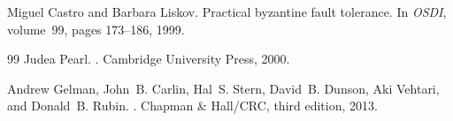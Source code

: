 \documentclass[12pt,a4paper]{article}
\begin{document}
\clearpage

\clearpage


\cite{sample2024}





Miguel Castro and Barbara Liskov.
\newblock Practical byzantine fault tolerance.
\newblock In {\em OSDI}, volume~99, pages 173--186, 1999.

\begin{thebibliography}{99}
Judea Pearl.
.
\newblock Cambridge University Press, 2000.

Andrew Gelman, John~B. Carlin, Hal~S. Stern, David~B. Dunson, Aki Vehtari, and Donald~B. Rubin.
.
\newblock Chapman \& Hall/CRC, third edition, 2013.

\end{thebibliography}
\end{document}
